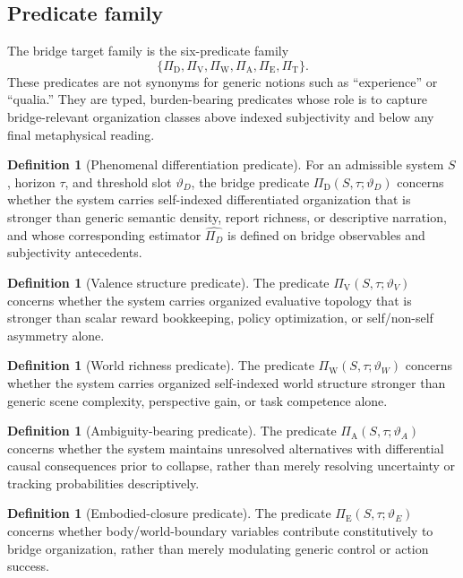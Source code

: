 \documentclass[11pt,a4paper]{article}
\theoremstyle{definition}
\newtheorem{definition}[theorem]{Definition}
\newcommand{\PiD}{\Pi_{\mathrm{D}}}
\newcommand{\PiV}{\Pi_{\mathrm{V}}}
\newcommand{\PiW}{\Pi_{\mathrm{W}}}
\newcommand{\PiA}{\Pi_{\mathrm{A}}}
\newcommand{\PiE}{\Pi_{\mathrm{E}}}
\newcommand{\PiT}{\Pi_{\mathrm{T}}}
\begin{document}
\subsection{Predicate family}
The bridge target family is the six-predicate family
\[
\{\PiD,\PiV,\PiW,\PiA,\PiE,\PiT\}.
\]
These predicates are not synonyms for generic notions such as ``experience'' or ``qualia.'' They are typed, burden-bearing predicates whose role is to capture bridge-relevant organization classes above indexed subjectivity and below any final metaphysical reading.

\begin{definition}[Phenomenal differentiation predicate]
For an admissible system $S$, horizon $\tau$, and threshold slot $\vartheta_D$, the bridge predicate $\PiD(S,\tau;\vartheta_D)$ concerns whether the system carries self-indexed differentiated organization that is stronger than generic semantic density, report richness, or descriptive narration, and whose corresponding estimator $\widehat{\Pi_D}$ is defined on bridge observables and subjectivity antecedents.
\end{definition}

\begin{definition}[Valence structure predicate]
The predicate $\PiV(S,\tau;\vartheta_V)$ concerns whether the system carries organized evaluative topology that is stronger than scalar reward bookkeeping, policy optimization, or self/non-self asymmetry alone.
\end{definition}

\begin{definition}[World richness predicate]
The predicate $\PiW(S,\tau;\vartheta_W)$ concerns whether the system carries organized self-indexed world structure stronger than generic scene complexity, perspective gain, or task competence alone.
\end{definition}

\begin{definition}[Ambiguity-bearing predicate]
The predicate $\PiA(S,\tau;\vartheta_A)$ concerns whether the system maintains unresolved alternatives with differential causal consequences prior to collapse, rather than merely resolving uncertainty or tracking probabilities descriptively.
\end{definition}

\begin{definition}[Embodied-closure predicate]
The predicate $\PiE(S,\tau;\vartheta_E)$ concerns whether body/world-boundary variables contribute constitutively to bridge organization, rather than merely modulating generic control or action success.
\end{definition}
\end{document}
